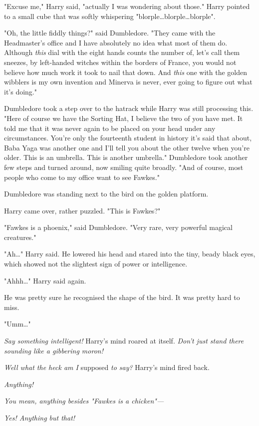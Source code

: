"Excuse me," Harry said, "actually I was wondering about those." Harry pointed
to a small cube that was softly whispering "blorple…blorple…blorple".

"Oh, the little fiddly things?" said Dumbledore. "They came with the
Headmaster’s office and I have absolutely no idea what most of them do.
Although \emph{this} dial with the eight hands counts the number of, let’s call
them sneezes, by left-handed witches within the borders of France, you would
not believe how much work it took to nail that down. And \emph{this} one with
the golden wibblers is my own invention and Minerva is never, ever going to
figure out what it’s doing."

Dumbledore took a step over to the hatrack while Harry was still processing
this. "Here of course we have the Sorting Hat, I believe the two of you have
met. It told me that it was never again to be placed on your head under any
circumstances. You’re only the fourteenth student in history it’s said that
about, Baba Yaga was another one and I’ll tell you about the other twelve when
you’re older. This is an umbrella. This is another umbrella." Dumbledore took
another few steps and turned around, now smiling quite broadly. "And of course,
most people who come to my office want to see Fawkes."

Dumbledore was standing next to the bird on the golden platform.

Harry came over, rather puzzled. "This is Fawkes?"

"Fawkes is a phoenix," said Dumbledore. "Very rare, very powerful magical
creatures."

"Ah…" Harry said. He lowered his head and stared into the tiny, beady
black eyes, which showed not the slightest sign of power or intelligence.

"Ahhh…" Harry said again.

He was pretty sure he recognised the shape of the bird. It was pretty hard to
miss.

"Umm…"

\emph{Say something intelligent!} Harry’s mind roared at itself. \emph{Don’t
just stand there sounding like a gibbering moron!}

\emph{Well what the heck am I} supposed \emph{to say?} Harry’s mind fired back.

\emph{Anything!}

\emph{You mean, anything besides "Fawkes is a chicken"—}

\emph{Yes! Anything but that!}

